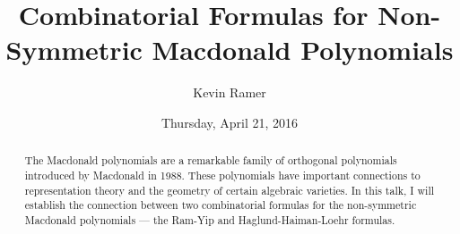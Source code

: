 \documentclass{UAmathtalk}
\author{Kevin Ramer}
\title{Combinatorial Formulas for Non-Symmetric Macdonald Polynomials}
\date{Thursday, April 21, 2016}
\begin{document}
\maketitle

\begin{abstract}
The Macdonald polynomials are a remarkable family of orthogonal polynomials introduced by Macdonald in 1988.  These polynomials have important connections to representation theory and the geometry of certain algebraic varieties. In this talk, I will establish the connection between two combinatorial formulas for the non-symmetric Macdonald polynomials --- the Ram-Yip and Haglund-Haiman-Loehr formulas.
\end{abstract}
\end{document}
